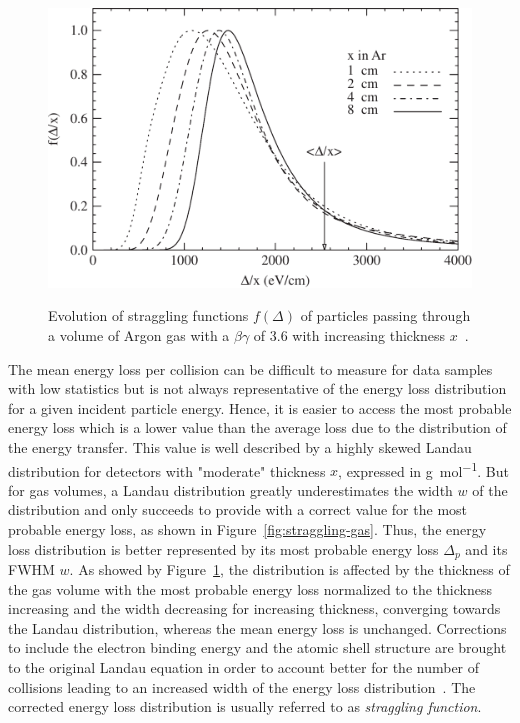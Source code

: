 	\begin{figure}
		\centering
		\includegraphics[width = \linewidth]{fig/chapt3/Straggling-gas-thickness.pdf}\\
		\caption{\label{fig:straggling-thickness} Evolution of straggling functions $f(\Delta)$ of particles passing through a volume of Argon gas with a $\beta\gamma$ of 3.6 with increasing thickness $x$~\cite{BISCHEL2006}.}
	\end{figure}
	
	The mean energy loss per collision can be difficult to measure for data samples with low statistics but is not always representative of the energy loss distribution for a given incident particle energy. Hence, it is easier to access the most probable energy loss which is a lower value than the average loss due to the distribution of the energy transfer. This value is well described by a highly skewed Landau distribution for detectors with "moderate" thickness $x$, expressed in \si{g.mol^{-1}}. But for gas volumes, a Landau distribution greatly underestimates the width $w$ of the distribution and only succeeds to provide with a correct value for the most probable energy loss, as shown in Figure~\ref{fig:straggling-gas}. Thus, the energy loss distribution is better represented by its most probable energy loss $\Delta_p$ and its \acf{FWHM} $w$. As showed by Figure~\ref{fig:straggling-thickness}, the distribution is affected by the thickness of the gas volume with the most probable energy loss normalized to the thickness increasing and the width decreasing for increasing thickness, converging towards the Landau distribution, whereas the mean energy loss is unchanged. Corrections to include the electron binding energy and the atomic shell structure are brought to the original Landau equation in order to account better for the number of collisions leading to an increased width of the energy loss distribution~\cite{BISCHEL2006}. The corrected energy loss distribution is usually referred to as \textit{straggling function}.
	
